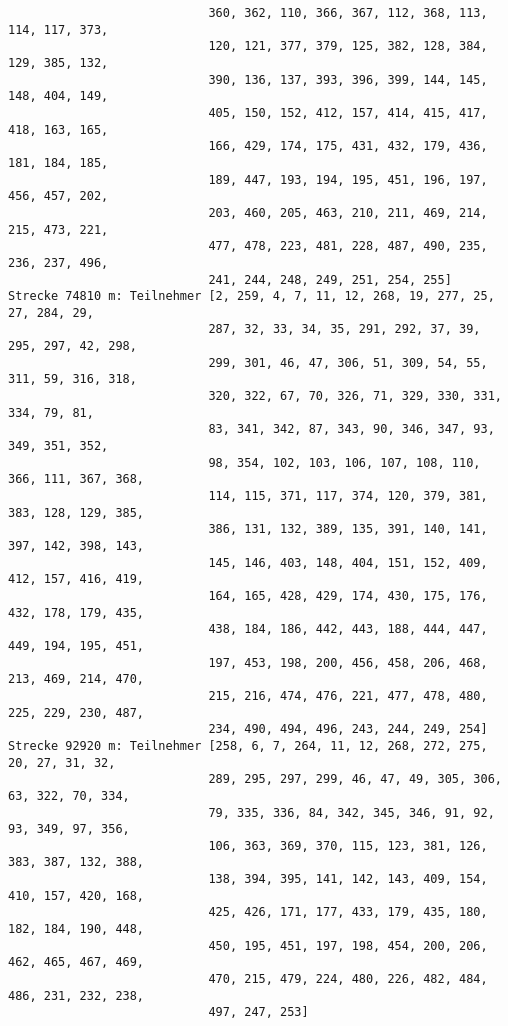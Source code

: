 \documentclass[a4paper,10pt,ngerman]{scrartcl}
\begin{document}
\begin{itemize}
\begin{verbatim}
                            360, 362, 110, 366, 367, 112, 368, 113, 114, 117, 373, 
                            120, 121, 377, 379, 125, 382, 128, 384, 129, 385, 132, 
                            390, 136, 137, 393, 396, 399, 144, 145, 148, 404, 149, 
                            405, 150, 152, 412, 157, 414, 415, 417, 418, 163, 165, 
                            166, 429, 174, 175, 431, 432, 179, 436, 181, 184, 185, 
                            189, 447, 193, 194, 195, 451, 196, 197, 456, 457, 202, 
                            203, 460, 205, 463, 210, 211, 469, 214, 215, 473, 221, 
                            477, 478, 223, 481, 228, 487, 490, 235, 236, 237, 496, 
                            241, 244, 248, 249, 251, 254, 255]
Strecke 74810 m: Teilnehmer [2, 259, 4, 7, 11, 12, 268, 19, 277, 25, 27, 284, 29, 
                            287, 32, 33, 34, 35, 291, 292, 37, 39, 295, 297, 42, 298, 
                            299, 301, 46, 47, 306, 51, 309, 54, 55, 311, 59, 316, 318, 
                            320, 322, 67, 70, 326, 71, 329, 330, 331, 334, 79, 81, 
                            83, 341, 342, 87, 343, 90, 346, 347, 93, 349, 351, 352, 
                            98, 354, 102, 103, 106, 107, 108, 110, 366, 111, 367, 368, 
                            114, 115, 371, 117, 374, 120, 379, 381, 383, 128, 129, 385, 
                            386, 131, 132, 389, 135, 391, 140, 141, 397, 142, 398, 143, 
                            145, 146, 403, 148, 404, 151, 152, 409, 412, 157, 416, 419, 
                            164, 165, 428, 429, 174, 430, 175, 176, 432, 178, 179, 435, 
                            438, 184, 186, 442, 443, 188, 444, 447, 449, 194, 195, 451, 
                            197, 453, 198, 200, 456, 458, 206, 468, 213, 469, 214, 470, 
                            215, 216, 474, 476, 221, 477, 478, 480, 225, 229, 230, 487, 
                            234, 490, 494, 496, 243, 244, 249, 254]
Strecke 92920 m: Teilnehmer [258, 6, 7, 264, 11, 12, 268, 272, 275, 20, 27, 31, 32, 
                            289, 295, 297, 299, 46, 47, 49, 305, 306, 63, 322, 70, 334, 
                            79, 335, 336, 84, 342, 345, 346, 91, 92, 93, 349, 97, 356, 
                            106, 363, 369, 370, 115, 123, 381, 126, 383, 387, 132, 388, 
                            138, 394, 395, 141, 142, 143, 409, 154, 410, 157, 420, 168, 
                            425, 426, 171, 177, 433, 179, 435, 180, 182, 184, 190, 448, 
                            450, 195, 451, 197, 198, 454, 200, 206, 462, 465, 467, 469, 
                            470, 215, 479, 224, 480, 226, 482, 484, 486, 231, 232, 238, 
                            497, 247, 253]


\end{verbatim}
\end{itemize}
\end{document}
